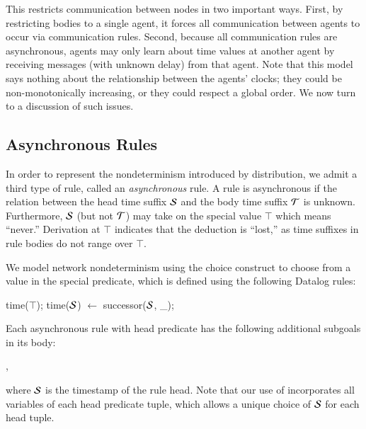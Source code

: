 This restricts communication between nodes in two important ways.
First, by restricting bodies to a single agent, it forces all
communication between agents to occur via communication rules.  Second,
because all communication rules are asynchronous, agents may only
learn about time values at another agent by receiving messages (with
unknown delay) from that agent.  Note that this model says nothing
about the relationship between the agents' clocks; they could be
non-monotonically increasing, or they could respect a global order.
We now turn to a discussion of such issues.

\subsection{Asynchronous Rules}

In order to represent the nondeterminism introduced by distribution, we admit a
third type of rule, called an {\em asynchronous} rule.  A rule is asynchronous
if the 
relation between the head time suffix $\SDedalus$ and the body time suffix $\Tau$ is
unknown.  Furthermore, $\SDedalus$ (but not $\Tau$) may take on the special value
$\top$ which means ``never.''  Derivation at $\top$ indicates that the
deduction is ``lost,'' as time suffixes in rule bodies do not range over
$\top$.

We model network nondeterminism using the choice construct to choose
from a value in the special 
predicate, which is defined using the following Datalog rules:

\begin{Dedalus}
time(\(\top\));
time(\(\SDedalus\)) \(\leftarrow\) successor(\(\SDedalus\), _);
\end{Dedalus}

\noindent
Each asynchronous rule with head predicate  has the following additional subgoals in its
body:

, 

where
$\SDedalus$ is the timestamp of the rule head.  Note that our use of  incorporates all variables of each head predicate tuple, which allows a unique choice of $\SDedalus$ for each head tuple.


